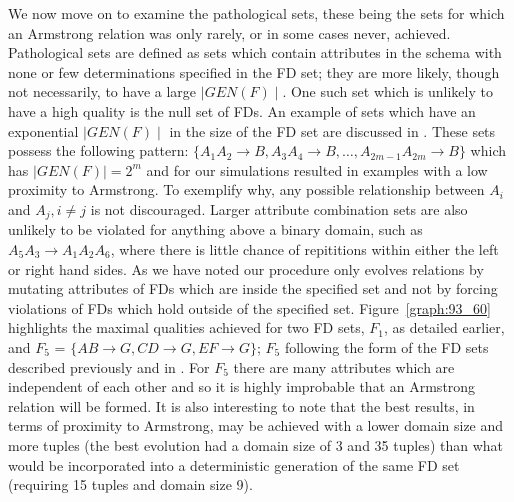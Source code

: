 We now move on to examine the pathological sets, these being
the sets for which an Armstrong relation was only rarely,
or in some cases never, achieved. Pathological sets are
defined as sets which contain attributes in the schema with none or
few
determinations specified in the FD set; they are more likely,
though not necessarily, to have a large $\mid GEN(F) \mid$. One
such set which is unlikely to have a high quality is the null
set of FDs. An example of sets which have an exponential $\mid GEN(F) \mid$
in the size of the FD set are discussed in \cite{bdfs84}.
These sets possess the following pattern: $\{ A_1A_2 \to B, A_3A_4 \to B, \ldots , A_{2m-1}A_{2m} \to B \}$ which has  $\mid GEN(F) \mid = 2^m$ and for
our simulations resulted in examples with a low proximity to Armstrong.
To exemplify why, any possible relationship between $A_i$ and $A_j, i \not= j$ is not discouraged. Larger attribute combination sets are also
unlikely to be violated for anything above a binary domain, such as
$A_5A_3 \to A_1A_2A_6$, where there is little chance of repititions
within either the left or right hand sides.
As we have noted
our procedure only evolves relations by mutating attributes of FDs which are
inside the specified set and not by forcing violations of FDs which hold outside of the specified set. 
Figure~\ref{graph:93_60} highlights the maximal qualities achieved for
two FD sets, $F_1$, as detailed earlier, and $F_5$ = $\{ AB \to G, CD \to G,
EF \to G \}$; $F_5$ following the form of the FD sets described previously
and in \cite{bdfs84}.  For $F_5$ there are many attributes which
are independent of each other and so it is highly improbable that an 
Armstrong relation will be formed. It is also interesting to note that
the best results, in terms of proximity to Armstrong, may be achieved 
with a lower domain size and more tuples  (the best evolution had a domain size of 3 and 35 tuples) than what would be incorporated
into a deterministic generation of the same FD set (requiring 15 tuples
and domain size 9).

\medskip

